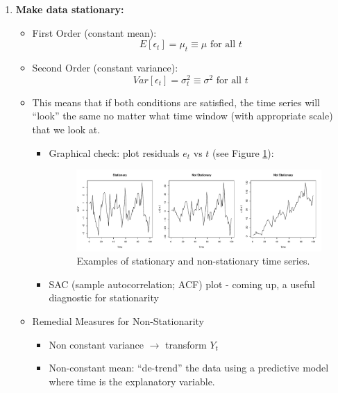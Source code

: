 \documentclass[12pt]{notes}
\begin{document}
\begin{enumerate}[leftmargin=*]
\item \textbf{Make data stationary:}

\begin{itemize}
\item First Order (constant mean):
\[E\left[\epsilon_t\right] = \mu_t \equiv \mu \text{ for all } t\]
\item Second Order (constant variance):
\[Var\left[\epsilon_t\right] = \sigma^2_t \equiv \sigma^2 \text{ for all } t\]
\item This means that if both conditions are satisfied, the time series will ``look'' the same no matter what time window (with appropriate scale) that we look at. 

\begin{itemize}
\item Graphical check: plot residuals $e_t$ vs $t$ (see Figure \ref{fig:tsExamples}):

\begin{figure}
\centering
\includegraphics[width=\textwidth]{figures/module6/tsExamples.pdf}
\caption{Examples of stationary and non-stationary time series.}
\label{fig:tsExamples}
\end{figure}

\item SAC (sample autocorrelation; ACF) plot - coming up, a useful diagnostic for stationarity
\end{itemize}

\item Remedial Measures for Non-Stationarity
\begin{itemize}
\item Non constant variance $\rightarrow$ transform $Y_t$

\item Non-constant mean: ``de-trend'' the data using a predictive model where time is the explanatory variable. 


\end{itemize}
\end{itemize}
\end{enumerate}
\end{document}
